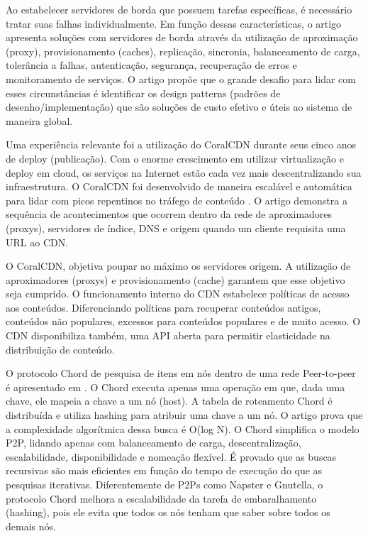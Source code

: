 Ao estabelecer servidores de borda que possuem tarefas específicas,
é necessário tratar suas falhas individualmente.
Em função dessas características, o artigo apresenta soluções com servidores de
borda através da utilização de aproximação (proxy), provisionamento (caches),
replicação, sincronia, balanceamento de carga, tolerância a falhas,
autenticação, segurança, recuperação de erros e monitoramento de serviços.
O artigo propõe que o grande desafio para lidar com esses circunstâncias é
identificar os design patterns (padrões de desenho/implementação) que são
soluções de custo efetivo e úteis ao sistema de maneira global.


Uma experiência relevante foi a utilização do CoralCDN durante seus cinco
anos de deploy (publicação).
Com o enorme crescimento em utilizar virtualização e deploy em cloud,
os serviços na Internet estão cada vez mais descentralizando
sua infraestrutura.
O CoralCDN foi desenvolvido de maneira escalável e automática para lidar com
picos repentinos no tráfego de conteúdo \citep{freedman2010experiences}.
O artigo demonstra a sequência de acontecimentos que ocorrem dentro da rede de
aproximadores (proxys), servidores de índice, DNS e origem quando um cliente
requisita uma URL ao CDN.

O CoralCDN, objetiva poupar ao máximo os servidores origem.
A utilização de aproximadores (proxys) e provisionamento (cache)
garantem que esse objetivo seja cumprido.
O funcionamento interno do CDN estabelece políticas de acesso aos conteúdos.
Diferenciando políticas para recuperar conteúdos antigos, conteúdos não
populares, excessos para conteúdos populares e de muito acesso. O CDN
disponibiliza também, uma API aberta para permitir elasticidade na
distribuição de conteúdo.

O protocolo Chord de pesquisa de itens em nós dentro de uma
rede Peer-to-peer é apresentado em \citep{ion2001chord}.
O Chord executa apenas uma operação em que, dada uma chave,
ele mapeia a chave a um nó (host).
A tabela de roteamento Chord é distribuída e utiliza hashing para
atribuir uma chave a um nó.
O artigo prova que a complexidade algorítmica dessa busca é O(log N).
O Chord simplifica o modelo P2P, lidando apenas com balanceamento de carga,
descentralização, escalabilidade, disponibilidade e nomeação flexível.
É provado que as buscas recursivas são mais eficientes em
função do tempo de execução do que as pesquisas iterativas.
Diferentemente de P2Ps como Napster e Gnutella, o protocolo Chord melhora a
escalabilidade da tarefa de embaralhamento (hashing), pois ele evita que
todos os nós tenham que saber sobre todos os demais nós.

